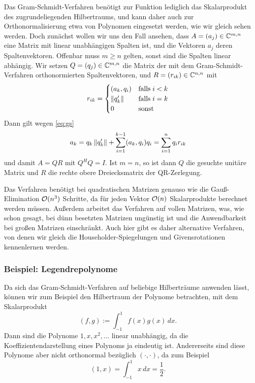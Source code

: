 Das Gram-Schmidt-Verfahren benötigt zur Funktion lediglich das
Skalarprodukt des zugrundeliegenden Hilbertraums, und kann daher auch
zur Orthonormalisierung etwa von Polynomen eingesetzt werden, wie wir
gleich sehen werden. Doch zunächst wollen wir uns den Fall ansehen,
dass $A=(a_j)\in\mathbb{C}^{m,n}$ eine Matrix mit linear unabhängigen Spalten
ist, und die Vektoren $a_j$ deren Spaltenvektoren. Offenbar muss $m\ge
n$ gelten, sonst sind die Spalten linear abhängig. Wir setzen
$Q=(q_j)\in\mathbb{C}^{m,n}$ die Matrix der mit dem Gram-Schmidt-Verfahren
orthonormierten Spaltenvektoren, und $R=(r_{ik})\in\mathbb{C}^{n,n}$ mit
\begin{equation}
  r_{ik} =
  \begin{cases}
    (a_k, q_i)  & \text{falls}\; i < k\\
    \left\lVert{q'_k}\right\rVert & \text{falls}\; i = k\\
    0           & \text{sonst}
  \end{cases}
\end{equation}
Dann gilt wegen \eqref{eq:gs}
\begin{equation}
  a_k = q_k\left\lVert{q'_k}\right\rVert + \sum_{i=1}^{k-1} (a_k, q_i) q_i =
  \sum_{i=1}^n  q_i r_{ik}
\end{equation}
und damit $A=QR$ mit $Q^HQ=I$. Ist $m=n$, so ist dann $Q$ die gesuchte
unitäre Matrix und $R$ die rechte obere Dreiecksmatrix der
QR-Zerlegung.

Das Verfahren benötigt bei quadratischen Matrizen genauso wie die
Gauß-Elimination $\mathcal O(n^3)$ Schritte, da für jeden Vektor $\mathcal O(n)$
Skalarprodukte berechnet werden müssen. Außerdem arbeitet das
Verfahren auf vollen Matrizen, was, wie schon gesagt, bei dünn
besetzten Matrizen ungünstig ist und die Anwendbarkeit bei großen
Matrizen einschränkt. Auch hier gibt es daher alternative Verfahren,
von denen wir gleich die Householder-Spiegelungen und Givensrotationen
kennenlernen werden.

\subsubsection{Beispiel: Legendrepolynome}

Da sich das Gram-Schmidt-Verfahren auf beliebige Hilberträume anwenden
lässt, können wir zum Beispiel den Hilbertraum der Polynome
betrachten, mit dem Skalarprodukt
\begin{equation}
  (f, g) := \int_{-1}^1 f(x)g(x)\, dx.
\end{equation}
Dann sind die Polynome $1,x,x^2,\ldots$ linear unabhängig, da die
Koeffizientendarstellung eines Polynoms ja eindeutig ist. Andererseits
sind diese Polynome aber nicht orthonormal bezüglich $(\cdot,\cdot)$,
da zum Beispiel
\begin{equation}
  (1, x) =  \int_{-1}^1 x\, dx = \frac{1}{2}.
\end{equation}

